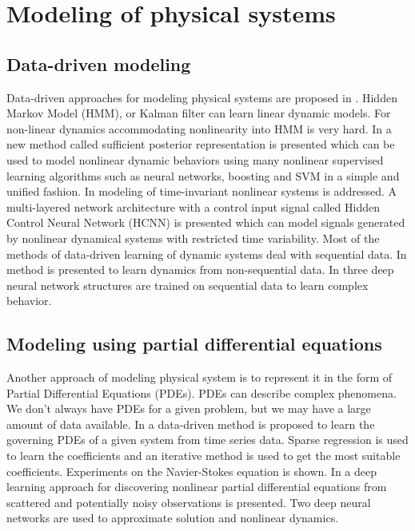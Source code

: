 \documentclass[conference]{IEEEtran}
\begin{document}
\section{Modeling of physical systems}

\subsection{\textbf{Data-driven modeling}}

Data-driven approaches for modeling physical systems are proposed in \cite{langford2009nonlinear, levin1991nips, john2009nonlinear, ogunmolu2016nonlinear}.  Hidden Markov Model (HMM), or Kalman filter can learn linear dynamic models. For non-linear dynamics accommodating nonlinearity into HMM is very hard. In \cite{langford2009nonlinear} a new method called sufficient posterior representation is presented which can be used to model nonlinear dynamic behaviors using many nonlinear supervised learning algorithms such as neural networks, boosting and SVM in a simple and unified fashion. In \cite{levin1991nips} modeling of time-invariant nonlinear systems is addressed. A multi-layered network architecture with a control input signal called Hidden Control Neural Network (HCNN) is presented which can model signals generated by nonlinear dynamical systems with restricted time variability. Most of the methods of data-driven learning of dynamic systems deal with sequential data. In \cite{john2009nonlinear} method is presented to learn dynamics from non-sequential data. In \cite{ogunmolu2016nonlinear} three deep neural network structures are trained on sequential data to learn complex behavior.

\subsection{\textbf{Modeling using partial differential equations}}

Another approach of modeling physical system is to represent it in the form of Partial Differential Equations (PDEs). PDEs can describe complex phenomena. We don't always have PDEs for a given problem, but we may have a large amount of data available. In \cite{rudy2017datadriven} a data-driven method is proposed to learn the governing PDEs of a given system from time series data. Sparse regression is used to learn the coefficients and an iterative method is used to get the most suitable coefficients. Experiments on the Navier-Stokes equation is shown. In \cite{raissi2018deep} a deep learning approach for discovering nonlinear partial differential equations from scattered and potentially noisy observations is presented. Two deep neural networks are used to approximate solution and nonlinear dynamics.
\end{document}
